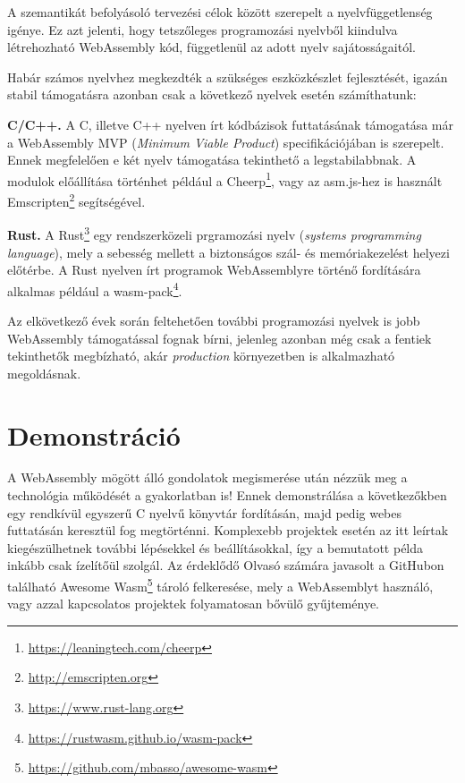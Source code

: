 A szemantikát befolyásoló tervezési célok között szerepelt a nyelvfüggetlenség igénye. Ez azt jelenti, hogy tetszőleges programozási nyelvből kiindulva létrehozható WebAssembly kód, függetlenül az adott nyelv sajátosságaitól.

Habár számos nyelvhez megkezdték a szükséges eszközkészlet fejlesztését, igazán stabil támogatásra azonban csak a következő nyelvek esetén számíthatunk:

\begin{outdentlist}
    \item[]\textbf{C/C++.}
    A C, illetve C++ nyelven írt kódbázisok futtatásának támogatása már a WebAssembly MVP (\textit{Minimum Viable Product}) specifikációjában is szerepelt. Ennek megfelelően e két nyelv támogatása tekinthető a legstabilabbnak. A modulok előállítása történhet például a Cheerp\footnote{\url{https://leaningtech.com/cheerp}}, vagy az asm.js-hez is használt Emscripten\footnote{\url{http://emscripten.org}} segítségével.

    \item[]\textbf{Rust.}
    A Rust\footnote{\url{https://www.rust-lang.org}} egy rendszerközeli prgramozási nyelv (\textit{systems programming language}), mely a sebesség mellett a biztonságos szál- és memóriakezelést helyezi előtérbe. A Rust nyelven írt programok WebAssemblyre történő fordítására alkalmas például a wasm-pack\footnote{\url{https://rustwasm.github.io/wasm-pack}}.
\end{outdentlist}

Az elkövetkező évek során feltehetően további programozási nyelvek is jobb WebAssembly támogatással fognak bírni, jelenleg azonban még csak a  fentiek tekinthetők megbízható, akár \textit{production} környezetben is alkalmazható megoldásnak.

\section{Demonstráció}

A WebAssembly mögött álló gondolatok megismerése után nézzük meg a technológia működését a gyakorlatban is! Ennek demonstrálása a következőkben egy rendkívül egyszerű C nyelvű könyvtár fordításán, majd pedig webes futtatásán keresztül fog megtörténni. Komplexebb projektek esetén az itt leírtak kiegészülhetnek további lépésekkel és beállításokkal, így a bemutatott példa inkább csak ízelítőül szolgál. Az érdeklődő Olvasó számára javasolt a GitHubon található Awesome Wasm\footnote{\url{https://github.com/mbasso/awesome-wasm}} tároló felkeresése, mely a WebAssemblyt használó, vagy azzal kapcsolatos projektek folyamatosan bővülő gyűjteménye.

